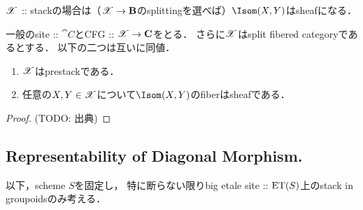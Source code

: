 \documentclass[a4paper, dvipdfmx]{jsarticle}
\begin{document}
$\mathscr{X}$ :: stackの場合は（$\mathscr{X} \to \mathbf{B}$のsplittingを選べば）$\Isom(X, Y)$はsheafになる．
\begin{Lemma}
    一般のsite :: $\cat{C}$とCFG :: $\mathscr{X} \to \mathbf{C}$をとる．
    さらに$\mathscr{X}$はsplit fibered categoryであるとする．
    以下の二つは互いに同値．
    \begin{enumerate}
        \item $\mathscr{X}$はprestackである．
        \item 任意の$X, Y \in \mathscr{X}$について$\Isom(X, Y)$のfiberはsheafである．
    \end{enumerate}
\end{Lemma}
\begin{proof}
    (TODO: 出典)
\end{proof}

\subsection{Representability of Diagonal Morphism.}
\begin{Remark}
    以下，scheme $S$を固定し，
    特に断らない限りbig etale site :: $\mathrm{ET}(S)$上のstack in groupoidsのみ考える．
\end{Remark}
\end{document}
